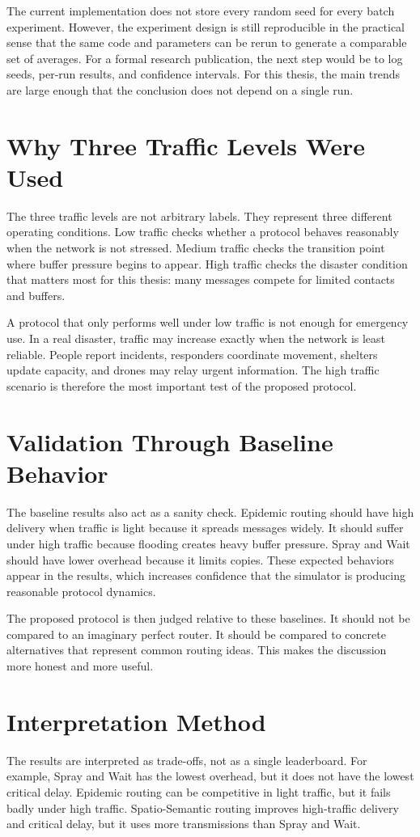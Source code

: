 The current implementation does not store every random seed for every batch experiment. However, the experiment design is still reproducible in the practical sense that the same code and parameters can be rerun to generate a comparable set of averages. For a formal research publication, the next step would be to log seeds, per-run results, and confidence intervals. For this thesis, the main trends are large enough that the conclusion does not depend on a single run.

\section{Why Three Traffic Levels Were Used}
The three traffic levels are not arbitrary labels. They represent three different operating conditions. Low traffic checks whether a protocol behaves reasonably when the network is not stressed. Medium traffic checks the transition point where buffer pressure begins to appear. High traffic checks the disaster condition that matters most for this thesis: many messages compete for limited contacts and buffers.

A protocol that only performs well under low traffic is not enough for emergency use. In a real disaster, traffic may increase exactly when the network is least reliable. People report incidents, responders coordinate movement, shelters update capacity, and drones may relay urgent information. The high traffic scenario is therefore the most important test of the proposed protocol.

\section{Validation Through Baseline Behavior}
The baseline results also act as a sanity check. Epidemic routing should have high delivery when traffic is light because it spreads messages widely. It should suffer under high traffic because flooding creates heavy buffer pressure. Spray and Wait should have lower overhead because it limits copies. These expected behaviors appear in the results, which increases confidence that the simulator is producing reasonable protocol dynamics.

The proposed protocol is then judged relative to these baselines. It should not be compared to an imaginary perfect router. It should be compared to concrete alternatives that represent common routing ideas. This makes the discussion more honest and more useful.

\section{Interpretation Method}
The results are interpreted as trade-offs, not as a single leaderboard. For example, Spray and Wait has the lowest overhead, but it does not have the lowest critical delay. Epidemic routing can be competitive in light traffic, but it fails badly under high traffic. Spatio-Semantic routing improves high-traffic delivery and critical delay, but it uses more transmissions than Spray and Wait.

